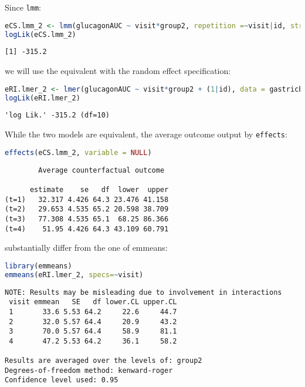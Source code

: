 \documentclass[12pt]{article}
\begin{document}
Since \texttt{lmm}:
\begin{lstlisting}[language=r,numbers=none]
eCS.lmm_2 <- lmm(glucagonAUC ~ visit*group2, repetition =~visit|id, structure = "CS", data = gastricbypassLB)
logLik(eCS.lmm_2)
\end{lstlisting}

\label{}
\begin{verbatim}
[1] -315.2
\end{verbatim}


we will use the equivalent with the random effect specification:

\begin{lstlisting}[language=r,numbers=none]
eRI.lmer_2 <- lmer(glucagonAUC ~ visit*group2 + (1|id), data = gastricbypassLB)
logLik(eRI.lmer_2)
\end{lstlisting}

\label{}
\begin{verbatim}
'log Lik.' -315.2 (df=10)
\end{verbatim}


While the two models are equivalent, the average outcome output by
\texttt{effects}:
\begin{lstlisting}[language=r,numbers=none]
effects(eCS.lmm_2, variable = NULL)
\end{lstlisting}

\label{}
\begin{verbatim}
		Average counterfactual outcome

      estimate    se   df  lower  upper
(t=1)   32.317 4.426 64.3 23.476 41.158
(t=2)   29.653 4.535 65.2 20.598 38.709
(t=3)   77.308 4.535 65.1  68.25 86.366
(t=4)    51.95 4.426 64.3 43.109 60.791
\end{verbatim}


substantially differ from the one of emmeans:
\begin{lstlisting}[language=r,numbers=none]
library(emmeans)
emmeans(eRI.lmer_2, specs=~visit)
\end{lstlisting}

\label{}
\begin{verbatim}
NOTE: Results may be misleading due to involvement in interactions
 visit emmean   SE   df lower.CL upper.CL
 1       33.6 5.53 64.2     22.6     44.7
 2       32.0 5.57 64.4     20.9     43.2
 3       70.0 5.57 64.4     58.9     81.1
 4       47.2 5.53 64.2     36.1     58.2

Results are averaged over the levels of: group2 
Degrees-of-freedom method: kenward-roger 
Confidence level used: 0.95
\end{verbatim}
\end{document}
